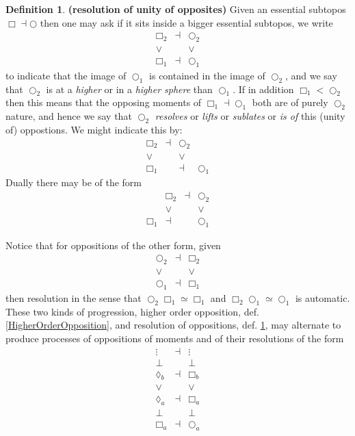 \documentclass[12pt,titlepage]{article}
\newcommand{\itexarray}[1]{\begin{matrix}#1\end{matrix}}
\newcommand{\lt}{<}
\theoremstyle{plain}
\theoremstyle{definition}
\newtheorem{defn}{Definition}
\theoremstyle{remark}
\begin{document}
\begin{defn}
\label{ResolutionOfOpposition}\hypertarget{ResolutionOfOpposition}{}
\textbf{(resolution of unity of opposites)}
Given an essential subtopos $\Box \dashv \bigcirc$ then one may ask if it sits inside a bigger essential subtopos, we write
\begin{displaymath}
\itexarray{
\Box_2 &\dashv& \bigcirc_2
\\
\vee && \vee
\\
\Box_1 &\dashv& \bigcirc_1
}
\end{displaymath}
to indicate that the image of $\bigcirc_1$ is contained in the image of $\bigcirc_2$, and we say that $\bigcirc_2$ is at a \emph{higher } or in a \emph{higher sphere} than $\bigcirc_1$.
If in addition $\Box_1 \lt \bigcirc_2$ then this means that the opposing moments of $\Box_1 \dashv \bigcirc_1$ both are of purely $\bigcirc_2$ nature, and hence we say that $\bigcirc_2$ \emph{resolves} or \emph{lifts} or \emph{sublates} or \emph{is  of} this (unity of) oppostions. We might indicate this by:
\begin{displaymath}
\itexarray{
\Box_2 &\dashv& \bigcirc_2
\\
\vee && \vee
\\
\Box_1 & &\dashv& \bigcirc_1
}
\end{displaymath}
Dually there may be  of the form
\begin{displaymath}
\itexarray{
& \Box_2 &\dashv& \bigcirc_2
\\
& \vee && \vee
\\
\Box_1 &\dashv& & \bigcirc_1
}
\end{displaymath}
\end{defn}
Notice that for oppositions of the other form, given
\begin{displaymath}
\itexarray{
\bigcirc_2 &\dashv& \Box_2
\\
\vee && \vee
\\
\bigcirc_1 &\dashv& \Box_1
}
\end{displaymath}
then resolution in the sense that $\bigcirc_2 \Box _1 \simeq \Box_1$ and $\Box_2 \bigcirc_1 \simeq \bigcirc_1$ is automatic.
These two kinds of progression, higher order opposition, def. \ref{HigherOrderOpposition}, and resolution of oppositions, def. \ref{ResolutionOfOpposition}, may alternate to produce processes of oppositions of moments and of their resolutions of the form
\begin{displaymath}
\itexarray{
\vdots  &\dashv& \vdots
\\
\bot && \bot
\\
\lozenge_b &\dashv& \Box_b
\\
\vee && \vee
\\
\lozenge_a &\dashv& \Box_a
\\
\bot && \bot
\\
\Box_a &\dashv& \bigcirc_a
}
\end{displaymath}
\end{document}
